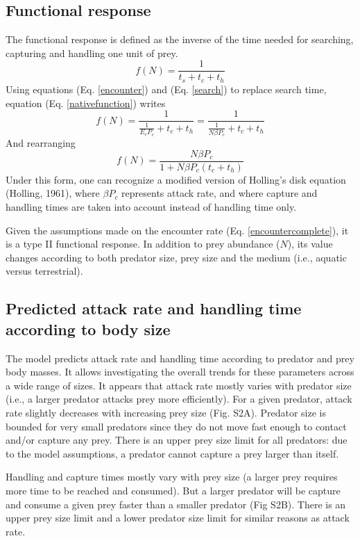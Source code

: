 \documentclass[utf8, 12 pt]{frontiers_suppmat}
\begin{document}
\subsection{Functional response}
The functional response is defined as the inverse of the time needed for searching, capturing and handling one unit of prey. 
\begin{equation}\label{nativefunction}
	f(N)= \frac{1}{t_s+t_c+t_h}
\end{equation}
Using equations (Eq. \ref{encounter}) and (Eq. \ref{search}) to replace search time, equation (Eq. \ref{nativefunction}) writes
\begin{equation}
	f(N)= \frac{1}{\frac{1}{E_r P_c}+t_c+t_h}=\frac{1}{\frac{1}{N \beta P_c}+t_c+t_h}
\end{equation}
And rearranging
\begin{equation}
	f(N)=\frac{N \beta P_c}{1+N \beta P_c (t_c+t_h)}
\end{equation}
Under this form, one can recognize a modified version of Holling’s disk equation (Holling, 1961)⁠, where $\beta P_c$ represents attack rate, and where capture and handling times are taken into account instead of handling time only.
\par
Given the assumptions made on the encounter rate (Eq. \ref{encountercomplete}), it is a type II functional response. In addition to prey abundance ($N$), its value changes according to both predator size, prey size and the medium (i.e., aquatic versus terrestrial).
\par

\subsection{Predicted attack rate and handling time according to body size}
The model predicts attack rate and handling time according to predator and prey body masses. It allows investigating the overall trends for these parameters across a wide range of sizes. It appears that attack rate mostly varies with predator size (i.e., a larger predator attacks prey more efficiently). For a given predator, attack rate slightly decreases with increasing prey size (Fig. S2A). Predator size is bounded for very small predators since they do not move fast enough to contact and/or capture any prey. There is an upper prey size limit for all predators: due to the model assumptions, a predator cannot capture a prey larger than itself. 
\par
Handling and capture times mostly vary with prey size (a larger prey requires more time to be reached and consumed). But a larger predator will be capture and consume a given prey faster than a smaller predator (Fig S2B). There is an upper prey size limit and a lower predator size limit for similar reasons as attack rate.    
\par  
\end{document}
